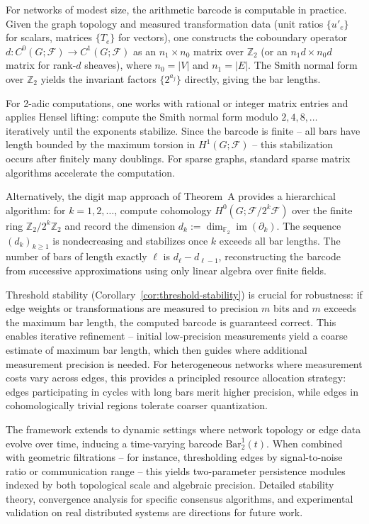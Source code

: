 \documentclass[11pt]{amsart}
\theoremstyle{plain}
\theoremstyle{definition}
\newcommand{\sheaf}[1]{\mathcal{#1}}                  %
\newcommand{\Digit}[1]{\partial_{#1}}%
\newcommand{\coboundary}{d}                           %
\DeclareMathOperator{\im}{im}                         %
\begin{document}
For networks of modest size, the arithmetic barcode is computable in practice. Given the graph topology and measured transformation data (unit ratios $\{u'_e\}$ for scalars, matrices $\{T_e\}$ for vectors), one constructs the coboundary operator $\coboundary: C^0(G;\sheaf{F}) \to C^1(G;\sheaf{F})$ as an $n_1 \times n_0$ matrix over $\mathbb{Z}_2$ (or an $n_1 d \times n_0 d$ matrix for rank-$d$ sheaves), where $n_0 = |V|$ and $n_1 = |E|$. The Smith normal form over $\mathbb{Z}_2$ yields the invariant factors $\{2^{a_j}\}$ directly, giving the bar lengths.

For 2-adic computations, one works with rational or integer matrix entries and applies Hensel lifting: compute the Smith normal form modulo $2, 4, 8, \ldots$ iteratively until the exponents stabilize. Since the barcode is finite -- all bars have length bounded by the maximum torsion in $H^1(G;\sheaf{F})$ -- this stabilization occurs after finitely many doublings. For sparse graphs, standard sparse matrix algorithms accelerate the computation.

Alternatively, the digit map approach of Theorem~A provides a hierarchical algorithm: for $k = 1, 2, \ldots$, compute cohomology $H^0(G;\sheaf{F}/2^k\sheaf{F})$ over the finite ring $\mathbb{Z}_2/2^k\mathbb{Z}_2$ and record the dimension $d_k := \dim_{\mathbb{F}_2} \im(\Digit{k})$. The sequence $(d_k)_{k \geq 1}$ is nondecreasing and stabilizes once $k$ exceeds all bar lengths. The number of bars of length exactly $\ell$ is $d_\ell - d_{\ell-1}$, reconstructing the barcode from successive approximations using only linear algebra over finite fields.

Threshold stability (Corollary~\ref{cor:threshold-stability}) is crucial for robustness: if edge weights or transformations are measured to precision $m$ bits and $m$ exceeds the maximum bar length, the computed barcode is guaranteed correct. This enables iterative refinement -- initial low-precision measurements yield a coarse estimate of maximum bar length, which then guides where additional measurement precision is needed. For heterogeneous networks where measurement costs vary across edges, this provides a principled resource allocation strategy: edges participating in cycles with long bars merit higher precision, while edges in cohomologically trivial regions tolerate coarser quantization.

The framework extends to dynamic settings where network topology or edge data evolve over time, inducing a time-varying barcode $\mathrm{Bar}^1_2(t)$. When combined with geometric filtrations -- for instance, thresholding edges by signal-to-noise ratio or communication range -- this yields two-parameter persistence modules indexed by both topological scale and algebraic precision. Detailed stability theory, convergence analysis for specific consensus algorithms, and experimental validation on real distributed systems are directions for future work.
\end{document}
